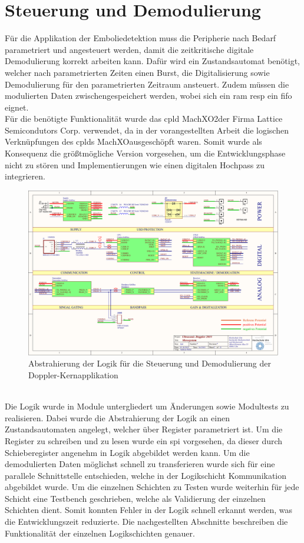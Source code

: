 \section{Steuerung und Demodulierung}
Für die Applikation der Emboliedetektion muss die Peripherie nach Bedarf parametriert und angesteuert werden, damit die zeitkritische digitale Demodulierung korrekt arbeiten kann. Dafür wird ein Zustandsautomat benötigt, welcher nach parametrierten Zeiten einen Burst, die Digitalisierung sowie Demodulierung für den parametrierten Zeitraum ansteuert. Zudem müssen die modulierten Daten zwischengespeichert werden, wobei sich ein \ac{ram} \ac{resp} ein \ac{fifo} eignet.\\
Für die benötigte Funktionalität wurde das \ac{cpld} MachXO2\SymbTM der Firma Lattice Semicondutors Corp. verwendet\cite{machxo2}, da in der vorangestellten Arbeit die logischen Verknüpfungen des \ac{cpld}s MachXO\SymbTM ausgeschöpft waren. Somit wurde als Konsequenz die größtmögliche Version vorgesehen, um die Entwicklungsphase nicht zu stören und Implementierungen wie einen digitalen Hochpass zu integrieren.
\begin{figure}[h!]
	\centering
	\includegraphics[page=11,width=1.0\textwidth, trim=28mm 89mm 38mm 35mm, clip=true]{images/pcb/new.PDF}
	\caption{Abstrahierung der Logik für die Steuerung und Demodulierung der Doppler-Kernapplikation}
	\label{fig:layer_cpld}
\end{figure}\\
Die Logik wurde in Module untergliedert um Änderungen sowie Modultests zu realisieren. Dabei wurde die Abstrahierung der Logik an einen Zustandsautomaten angelegt, welcher über Register parametriert ist. Um die Register zu schreiben und zu lesen wurde ein \ac{spi} vorgesehen, da dieser durch Schieberegister angenehm in Logik abgebildet werden kann. Um die demodulierten Daten möglichst schnell zu transferieren wurde sich für eine parallele Schnittstelle entschieden, welche in der Logikschicht Kommunikation abgebildet wurde. Um die einzelnen Schichten zu Testen wurde weiterhin für jede Schicht eine Testbench geschrieben, welche als Validierung der einzelnen Schichten dient. Somit konnten Fehler in der Logik schnell erkannt werden, was die Entwicklungszeit reduzierte.
Die nachgestellten Abschnitte beschreiben die Funktionalität der einzelnen Logikschichten genauer.
